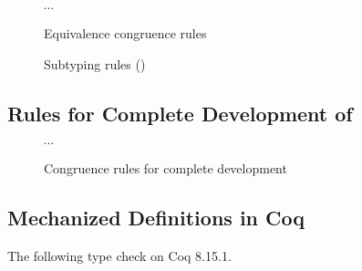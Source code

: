 \documentclass[acmsmall,review,anonymous]{acmart}\settopmatter{printfolios=true,printccs=false,printacmref=false}
\begin{document}
\begin{figure}[h]
\centering
{} \qquad $\cdots$ \hfill
{}
\caption{Equivalence congruence rules}
\label{fig:cong:equiv}
\end{figure}
\begin{figure}[h]
\centering
{}
\caption{Subtyping rules (\CICE)}
\label{fig:subtyping-cic}
\end{figure}

\clearpage
\subsection{Rules for Complete Development of \lang} \label{app:develop}

\begin{figure}[h]
\centering
{} \qquad $\cdots$ \hfill
{}
\label{fig:develop:cong}
\caption{Congruence rules for complete development}
\end{figure}

\clearpage
\setmonofont{iosevka.ttc}
\subsection{Mechanized \CICE Definitions in Coq}

The following type check on Coq 8.15.1.
\end{document}
